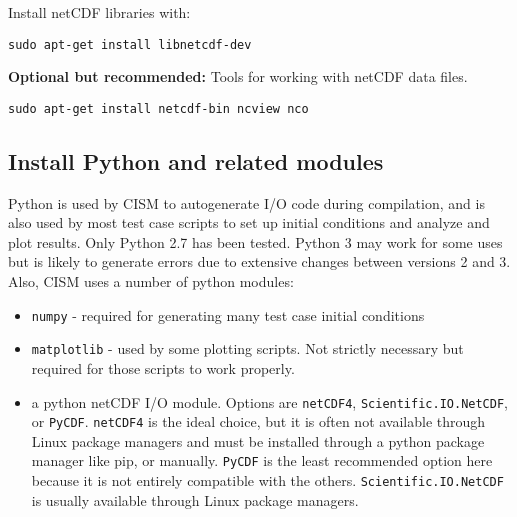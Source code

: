 \begin{mdframed}[style=ubuntu] %
Install netCDF libraries with:

\texttt{sudo apt-get install libnetcdf-dev}

\textbf{Optional but recommended:} Tools for working with netCDF data files.

\texttt{sudo apt-get install netcdf-bin ncview nco}
\end{mdframed}                 %



\subsection{Install Python and related modules}
Python is used by CISM to autogenerate I/O code during compilation, and is also
used by most test case scripts to set up initial conditions and analyze and plot
results.  Only Python 2.7 has been tested.  Python 3 may work for some uses but is
likely to generate errors due to extensive changes between versions 2 and 3.
Also, CISM uses a number of python modules:
\begin{itemize}
  \item \texttt{numpy} - required for generating many test case initial conditions
  \item \texttt{matplotlib} - used by some plotting scripts.  Not strictly necessary but required for those scripts to work properly.
  \item  a python netCDF I/O module.  Options are \texttt{netCDF4},  \texttt{Scientific.IO.NetCDF}, or \texttt{PyCDF}.  
\texttt{netCDF4} is the ideal choice, but it is often not available through Linux package managers and must be installed through a python package manager like pip, or manually.
\texttt{PyCDF} is the least recommended option here because it is not entirely compatible with the others.  \texttt{Scientific.IO.NetCDF} is usually available through Linux package managers.
\end{itemize}


